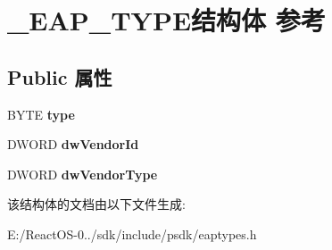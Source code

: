 \hypertarget{struct___e_a_p___t_y_p_e}{}\section{\+\_\+\+E\+A\+P\+\_\+\+T\+Y\+P\+E结构体 参考}
\label{struct___e_a_p___t_y_p_e}
\subsection*{Public 属性}
\begin{DoxyCompactItemize}
\item 
\mbox{\label{struct___e_a_p___t_y_p_e_a548925730b9bc5e0309e602708f83254}} 
B\+Y\+TE {\bfseries type}
\item 
\mbox{\label{struct___e_a_p___t_y_p_e_a618b3a8dc9d9864e628c9165653dd390}} 
D\+W\+O\+RD {\bfseries dw\+Vendor\+Id}
\item 
\mbox{\label{struct___e_a_p___t_y_p_e_a32a6290ba31961cdb7273d04281706a1}} 
D\+W\+O\+RD {\bfseries dw\+Vendor\+Type}
\end{DoxyCompactItemize}


该结构体的文档由以下文件生成\+:\begin{DoxyCompactItemize}
\item 
E\+:/\+React\+O\+S-\/0../sdk/include/psdk/eaptypes.\+h\end{DoxyCompactItemize}
